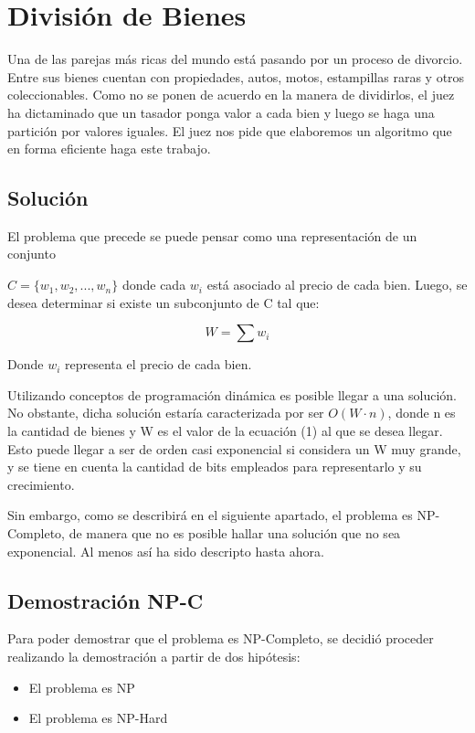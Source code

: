 \section{División de Bienes}

Una de las parejas más ricas del mundo está pasando por un proceso de divorcio. Entre sus bienes cuentan con propiedades, autos, motos, estampillas raras y otros coleccionables. Como no se ponen de acuerdo en la manera de dividirlos, el juez ha dictaminado que un tasador ponga valor a cada bien y luego se haga una partición por valores iguales. El juez nos pide que elaboremos un algoritmo que en forma eficiente haga este trabajo.\newline

\subsection{Solución}
El problema que precede se puede pensar como una representación de un conjunto

$C=\{w_{1}, w_{2}, ..., w_{n}\}$ donde cada $w_{i}$ está asociado al precio de cada bien. Luego, se desea determinar si existe un subconjunto de C tal que:

\begin{equation}
    W=\sum w_{i}
\end{equation}

Donde $w_{i}$ representa el precio de cada bien.

Utilizando conceptos de programación dinámica es posible llegar a una solución. No obstante, dicha solución estaría caracterizada por ser $O(W\cdot n)$, donde n es la cantidad de bienes y W es el valor de la ecuación (1) al que se desea llegar. Esto puede llegar a ser de orden casi exponencial si considera un W muy grande, y se tiene en cuenta la cantidad de bits empleados para representarlo y su crecimiento.

Sin embargo, como se describirá en el siguiente apartado, el problema es NP-Completo, de manera que no es posible hallar una solución que no sea exponencial. Al menos así ha sido descripto hasta ahora.

\subsection{Demostración NP-C}
Para poder demostrar que el problema es NP-Completo, se decidió proceder realizando la demostración a partir de dos hipótesis:
\begin{itemize}
    \item El problema es NP
    \item El problema es NP-Hard
\end{itemize}

